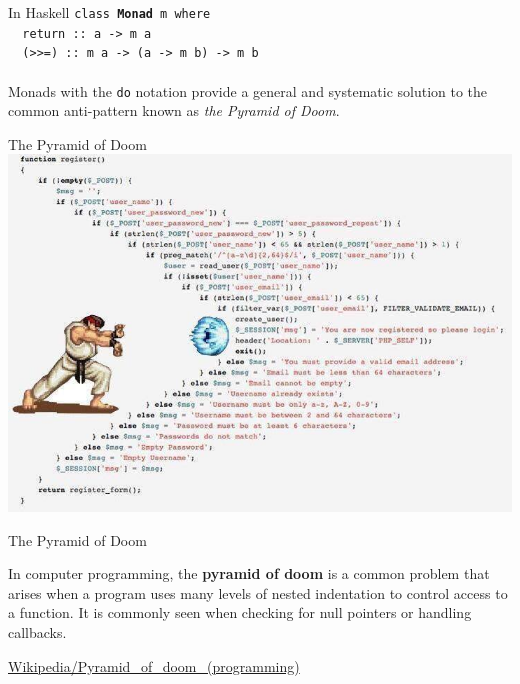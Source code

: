 \documentclass{beamer}
\begin{document}
\begin{frame}{In Haskell} \pause
  \texttt{class \textbf{Monad} m where\\ \pause
    \ \ return\ ::\ a -> m a\\ \pause
    \ \ (>>=)\ ::\ m a -> (a -> m b) -> m b\\ \pause
  } \ \\
  Monads with the \texttt{do} notation provide a general
  and systematic solution to the common anti-pattern known
  as \textit{the Pyramid of Doom}.
\end{frame}

\begin{frame}{The Pyramid of Doom}
  \includegraphics[width=\textwidth]{pyramid-of-doom.jpg}  
\end{frame}

\begin{frame}{The Pyramid of Doom}
  \begin{displayquote}
    In computer programming, the \textbf{pyramid of doom}
    is a common problem that arises when a program uses many
    levels of nested indentation to control access to a function.
    It is commonly seen when checking for null pointers or handling
    callbacks.
  \end{displayquote}
  
  \begin{flushright}
    {\footnotesize \href{https://en.wikipedia.org/wiki/Pyramid_of_doom_(programming)}{Wikipedia/Pyramid\_of\_doom\_(programming)}}
  \end{flushright}
\end{frame}
\end{document}
